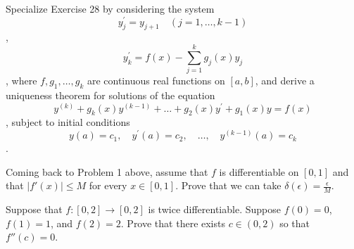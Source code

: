   \begin{exercise}[Rudin 5.29]
    Specialize Exercise 28 by considering the system
    \begin{equation}
      y^\prime_j = y_{j+1} \quad (j = 1, \dots, k-1)
    \end{equation}
   ,
    \begin{equation}
      y^\prime_k = f(x) - \sum_{j=1}^k g_j(x) y_j
    \end{equation}
   , where $f, g_1, \dots, g_k$ are continuous real functions on $[a, b]$, and derive a uniqueness theorem for solutions of the equation
    \begin{equation}
      y^{(k)} + g_k(x)y^{(k-1)} + \dots + g_2(x)y^\prime + g_1(x)y = f(x)
    \end{equation}
   , subject to initial conditions
    \begin{equation}
      y(a) = c_1, \quad y^\prime(a) = c_2, \quad \dots, \quad y^{(k-1)}(a) = c_k
    \end{equation}
   .
  \end{exercise}
  \begin{solution}

  \end{solution}
  
  \begin{exercise}
    Coming back to Problem 1 above, assume that $f$ is differentiable on $[0, 1]$ and that $|f'(x)| \leq M$ for every $x \in [0, 1]$. Prove that we can take $\delta(\epsilon) = \frac{\epsilon}{M}$.
  \end{exercise}
  \begin{solution}

  \end{solution}

  \begin{exercise}
    Suppose that $f : [0, 2] \to [0, 2]$ is twice differentiable. Suppose $f(0) = 0$, $f(1) = 1$, and $f(2) = 2$. Prove that there exists $c \in (0, 2)$ so that $f''(c) = 0$.
  \end{exercise}
  \begin{solution}

  \end{solution}

